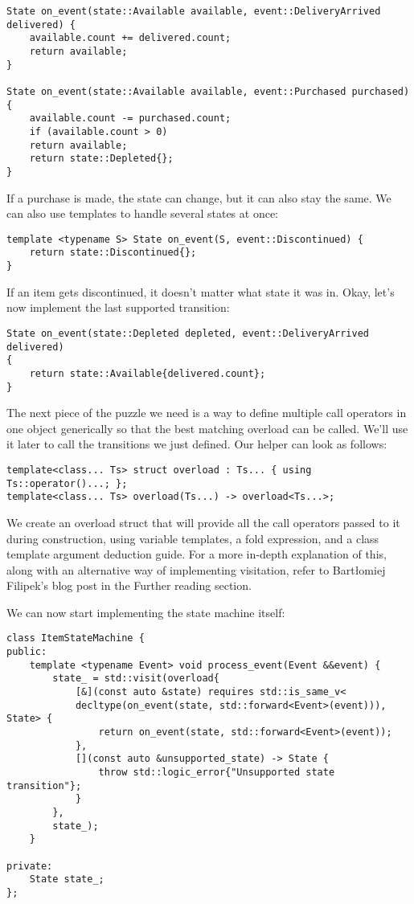 \begin{lstlisting}[style=styleCXX]
State on_event(state::Available available, event::DeliveryArrived
delivered) {
	available.count += delivered.count;
	return available;
}

State on_event(state::Available available, event::Purchased purchased) {
	available.count -= purchased.count;
	if (available.count > 0)
	return available;
	return state::Depleted{};
}
\end{lstlisting}

If a purchase is made, the state can change, but it can also stay the same. We can also use templates to handle several states at once:

\begin{lstlisting}[style=styleCXX]
template <typename S> State on_event(S, event::Discontinued) {
	return state::Discontinued{};
}
\end{lstlisting}

If an item gets discontinued, it doesn't matter what state it was in. Okay, let's now implement the last supported transition:

\begin{lstlisting}[style=styleCXX]
State on_event(state::Depleted depleted, event::DeliveryArrived delivered)
{
	return state::Available{delivered.count};
}
\end{lstlisting}

The next piece of the puzzle we need is a way to define multiple call operators in one object generically so that the best matching overload can be called. We'll use it later to call the transitions we just defined. Our helper can look as follows:

\begin{lstlisting}[style=styleCXX]
template<class... Ts> struct overload : Ts... { using Ts::operator()...; };
template<class... Ts> overload(Ts...) -> overload<Ts...>;
\end{lstlisting}

We create an overload struct that will provide all the call operators passed to it during construction, using variable templates, a fold expression, and a class template argument deduction guide. For a more in-depth explanation of this, along with an alternative way of implementing visitation, refer to Bartłomiej Filipek's blog post in the Further reading section.

We can now start implementing the state machine itself:

\begin{lstlisting}[style=styleCXX]
class ItemStateMachine {
public:
	template <typename Event> void process_event(Event &&event) {
		state_ = std::visit(overload{
			[&](const auto &state) requires std::is_same_v<
			decltype(on_event(state, std::forward<Event>(event))), State> {
				return on_event(state, std::forward<Event>(event));
			},
			[](const auto &unsupported_state) -> State {
				throw std::logic_error{"Unsupported state transition"};
			}
		},
		state_);
	}

private:
	State state_;
};
\end{lstlisting}

